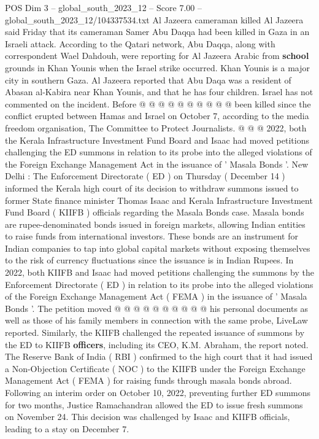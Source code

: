\begin{textsample}{POS Dim 3 – global\_south\_2023\_12 – Score 7.00 – global\_south\_2023\_12/104337534.txt}
Al Jazeera cameraman killed Al Jazeera said Friday that its cameraman Samer Abu Daqqa had been killed in Gaza in an Israeli attack.
According to the Qatari network, Abu Daqqa, along with correspondent Wael Dahdouh, were reporting for Al Jazeera Arabic from \textbf{school} grounds in Khan Younis when the Israel strike occurred.
Khan Younis is a major city in southern Gaza.
Al Jazeera reported that Abu Daqa was a resident of Abasan al-Kabira near Khan Younis, and that he has four children.
Israel has not commented on the incident.
Before @ @ @ @ @ @ @ @ @ @ been killed since the conflict erupted between Hamas and Israel on October 7, according to the media freedom organisation, The Committee to Protect Journalists. @ @ @ 2022, both the Kerala Infrastructure Investment Fund Board and Isaac had moved petitions challenging the ED summons in relation to its probe into the alleged violations of the Foreign Exchange Management Act in the issuance of ' Masala Bonds '.
New Delhi : The Enforcement Directorate ( ED ) on Thursday ( December 14 ) informed the Kerala high court of its decision to withdraw summons issued to former State finance minister Thomas Isaac and Kerala Infrastructure Investment Fund Board ( KIIFB ) officials regarding the Masala Bonds case.
Masala bonds are rupee-denominated bonds issued in foreign markets, allowing Indian entities to raise funds from international investors.
These bonds are an instrument for Indian companies to tap into global capital markets without exposing themselves to the risk of currency fluctuations since the issuance is in Indian Rupees.
In 2022, both KIIFB and Isaac had moved petitions challenging the summons by the Enforcement Directorate ( ED ) in relation to its probe into the alleged violations of the Foreign Exchange Management Act ( FEMA ) in the issuance of ' Masala Bonds '.
The petition moved @ @ @ @ @ @ @ @ @ @ his personal documents as well as those of his family members in connection with the same probe, LiveLaw reported.
Similarly, the KIIFB challenged the repeated issuance of summons by the ED to KIIFB \textbf{officers}, including its CEO, K.M.
Abraham, the report noted.
The Reserve Bank of India ( RBI ) confirmed to the high court that it had issued a Non-Objection Certificate ( NOC ) to the KIIFB under the Foreign Exchange Management Act ( FEMA ) for raising funds through masala bonds abroad.
Following an interim order on October 10, 2022, preventing further ED summons for two months, Justice Ramachandran allowed the ED to issue fresh summons on November 24.
This decision was challenged by Isaac and KIIFB officials, leading to a stay on December 7.

\end{textsample}
